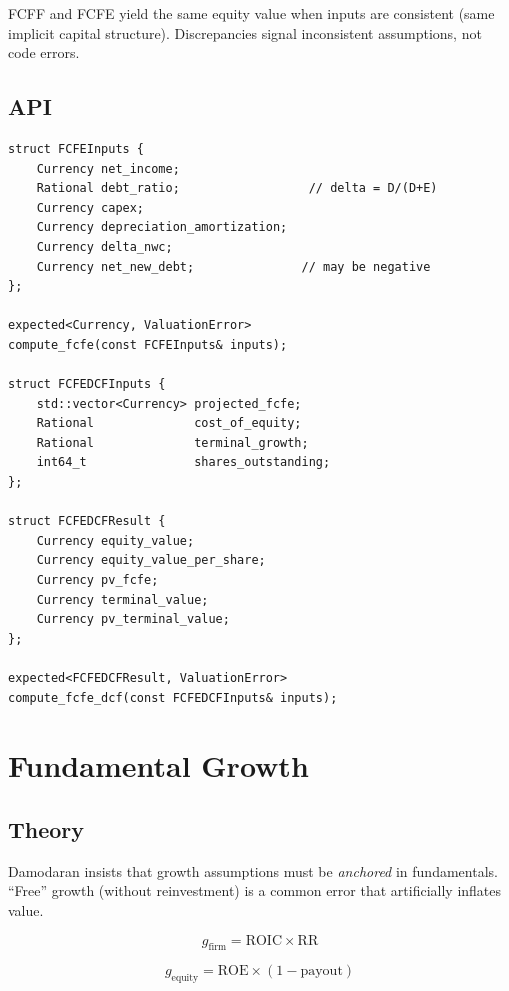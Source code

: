 \documentclass[12pt, a4paper, oneside]{book}
\newcommand{\ROIC}{\ensuremath{\mathrm{ROIC}}}
\newcommand{\ROE}{\ensuremath{\mathrm{ROE}}}
\newcommand{\RR}{\mathrm{RR}}
\begin{document}
\begin{warning}
FCFF and FCFE yield the same equity value when inputs are consistent
(same implicit capital structure). Discrepancies signal inconsistent
assumptions, not code errors.
\end{warning}

\subsection{API}

\begin{lstlisting}[style=cpp]
struct FCFEInputs {
    Currency net_income;
    Rational debt_ratio;                  // delta = D/(D+E)
    Currency capex;
    Currency depreciation_amortization;
    Currency delta_nwc;
    Currency net_new_debt;               // may be negative
};

expected<Currency, ValuationError>
compute_fcfe(const FCFEInputs& inputs);

struct FCFEDCFInputs {
    std::vector<Currency> projected_fcfe;
    Rational              cost_of_equity;
    Rational              terminal_growth;
    int64_t               shares_outstanding;
};

struct FCFEDCFResult {
    Currency equity_value;
    Currency equity_value_per_share;
    Currency pv_fcfe;
    Currency terminal_value;
    Currency pv_terminal_value;
};

expected<FCFEDCFResult, ValuationError>
compute_fcfe_dcf(const FCFEDCFInputs& inputs);
\end{lstlisting}

\section{Fundamental Growth}
\label{sec:growth}

\subsection{Theory}

Damodaran insists that growth assumptions must be \emph{anchored} in
fundamentals. ``Free'' growth (without reinvestment) is a common error
that artificially inflates value.

\begin{equation}
  g_{\text{firm}} = \ROIC \times \RR
  \label{eq:g_firma}
\end{equation}

\begin{equation}
  g_{\text{equity}} = \ROE \times (1 - \text{payout})
  \label{eq:g_equity}
\end{equation}
\end{document}
